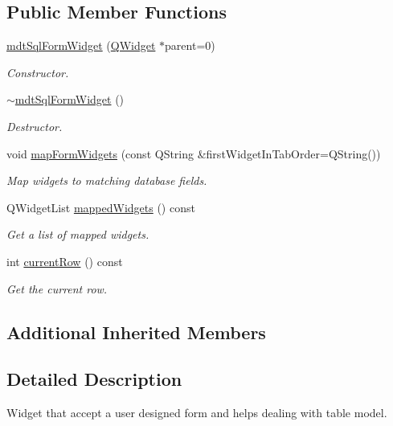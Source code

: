 \subsection*{Public Member Functions}
\begin{DoxyCompactItemize}
\item 
\hyperlink{classmdt_sql_form_widget_a53570f49eac1a7fa490546497c88ad13}{mdt\-Sql\-Form\-Widget} (\hyperlink{class_q_widget}{Q\-Widget} $\ast$parent=0)
\begin{DoxyCompactList}\small\item\em Constructor. \end{DoxyCompactList}\item 
\hyperlink{classmdt_sql_form_widget_a38df8efea5c216ea2b6f047e3280aac5}{$\sim$mdt\-Sql\-Form\-Widget} ()
\begin{DoxyCompactList}\small\item\em Destructor. \end{DoxyCompactList}\item 
void \hyperlink{classmdt_sql_form_widget_ace4f7fad749a4efe1233b61d071b3926}{map\-Form\-Widgets} (const Q\-String \&first\-Widget\-In\-Tab\-Order=Q\-String())
\begin{DoxyCompactList}\small\item\em Map widgets to matching database fields. \end{DoxyCompactList}\item 
Q\-Widget\-List \hyperlink{classmdt_sql_form_widget_a92648a10dd7e830faca0989007c49b6e}{mapped\-Widgets} () const 
\begin{DoxyCompactList}\small\item\em Get a list of mapped widgets. \end{DoxyCompactList}\item 
int \hyperlink{classmdt_sql_form_widget_a9588fdc58b30440077b8dcfa3a2fb3c0}{current\-Row} () const 
\begin{DoxyCompactList}\small\item\em Get the current row. \end{DoxyCompactList}\end{DoxyCompactItemize}
\subsection*{Additional Inherited Members}


\subsection{Detailed Description}
Widget that accept a user designed form and helps dealing with table model. 

